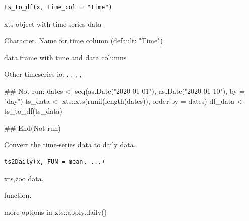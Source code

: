 \documentclass[a4paper]{book}
\begin{document}
%
\begin{Usage}
\begin{verbatim}
ts_to_df(x, time_col = "Time")
\end{verbatim}
\end{Usage}
%
\begin{Arguments}
\begin{ldescription}
\item[\code{x}] xts object with time series data

\item[\code{time\_col}] Character. Name for time column (default: "Time")
\end{ldescription}
\end{Arguments}
%
\begin{Value}
data.frame with time and data columns
\end{Value}
%
\begin{SeeAlso}\relax
Other timeseries-io: 
,
,
,
,
\end{SeeAlso}
%
\begin{Examples}
\begin{ExampleCode}
## Not run: 
dates <- seq(as.Date("2020-01-01"), as.Date("2020-01-10"), by = "day")
ts_data <- xts::xts(runif(length(dates)), order.by = dates)
df_data <- ts_to_df(ts_data)

## End(Not run)
\end{ExampleCode}
\end{Examples}
%
\begin{Description}\relax
Convert the time-series data to daily data.
\end{Description}
%
\begin{Usage}
\begin{verbatim}
ts2Daily(x, FUN = mean, ...)
\end{verbatim}
\end{Usage}
%
\begin{Arguments}
\begin{ldescription}
\item[\code{x}] xts,zoo data.

\item[\code{FUN}] function.

\item[\code{...}] more options in xts::apply.daily()
\end{ldescription}
\end{Arguments}
\end{document}
